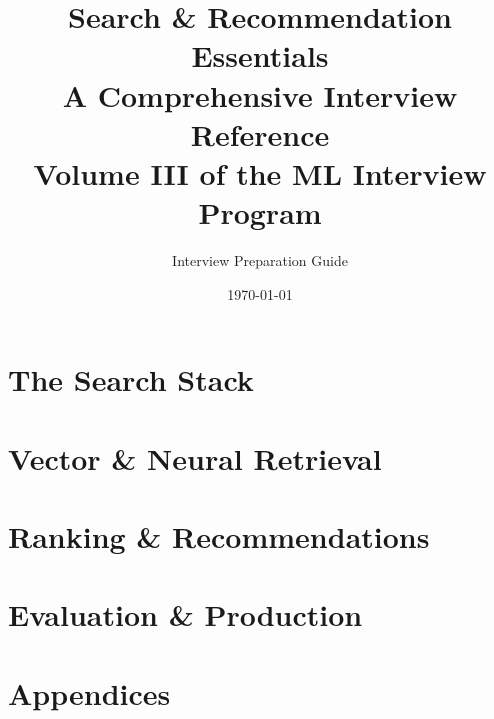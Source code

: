 \documentclass[11pt,twoside]{book}
\title{
    \Huge\textbf{Search \& Recommendation Essentials}\\[0.5cm]
    \Large A Comprehensive Interview Reference\\[0.3cm]
    \large Volume III of the ML Interview Program
}
\author{Interview Preparation Guide}
\date{\today}
\begin{document}
\frontmatter
\maketitle
\tableofcontents



\mainmatter

\part{The Search Stack}



\part{Vector \& Neural Retrieval}



\part{Ranking \& Recommendations}



\part{Evaluation \& Production}



\appendix
\part{Appendices}





\backmatter
\end{document}
